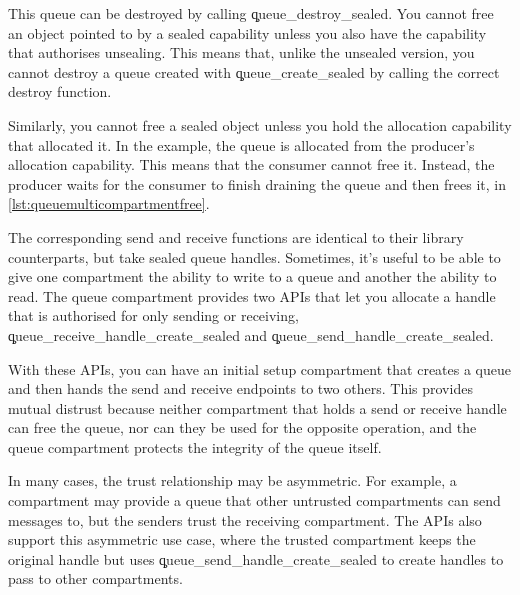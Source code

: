 \codelisting[filename=examples/producer_consumer_compartment/consumer.cc,marker=set_queue,label=lst:queuemulticompartmentsetqueue,caption="Receiving a queue endpoint in the consumer compartment."]{}

This queue can be destroyed by calling \c{queue_destroy_sealed}.
You cannot free an object pointed to by a sealed capability unless you also have the capability that authorises unsealing.
This means that, unlike the unsealed version, you cannot destroy a queue created with \c{queue_create_sealed}  by calling the correct destroy function.

Similarly, you cannot free a sealed object unless you hold the allocation capability that allocated it.
In the example, the queue is allocated from the producer's allocation capability.
This means that the consumer cannot free it.
Instead, the producer waits for the consumer to finish draining the queue and then frees it, in \ref{lst:queuemulticompartmentfree}.

\codelisting[filename=examples/producer_consumer_compartment/producer.cc,marker=queue_cleanup,label=lst:queuemulticompartmentfree,caption="Freeing a message queue once it is empty."]{}


The corresponding send and receive functions are identical to their library counterparts, but take sealed queue handles.
Sometimes, it's useful to be able to give one compartment the ability to write to a queue and another the ability to read.
The queue compartment provides two APIs that let you allocate a handle that is authorised for only sending or receiving, \c{queue_receive_handle_create_sealed} and \c{queue_send_handle_create_sealed}.



With these APIs, you can have an initial setup compartment that creates a queue and then hands the send and receive endpoints to two others.
This provides mutual distrust because neither compartment that holds a send or receive handle can free the queue, nor can they be used for the opposite operation, and the queue compartment protects the integrity of the queue itself.

In many cases, the trust relationship may be asymmetric.
For example, a compartment may provide a queue that other untrusted compartments can send messages to, but the senders trust the receiving compartment.
The APIs also support this asymmetric use case, where the trusted compartment keeps the original handle but uses \c{queue_send_handle_create_sealed} to create handles to pass to other compartments.

